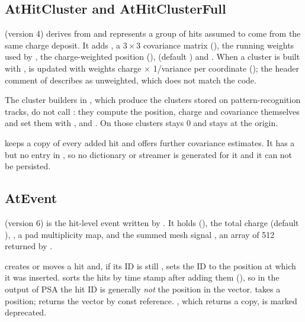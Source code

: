 \subsection{AtHitCluster and AtHitClusterFull}

 (version 4) derives from  and represents a group of hits assumed to come
from the same charge deposit. It adds , a $3\times3$ covariance matrix
 (), the running weights used by , the charge-weighted
position  (),  (default ) and
. When a cluster is built with ,  is
updated with weights charge $\times$ 1/variance per coordinate (); the
header comment of  describes  as unweighted, which does not match
the code.

The cluster builders in , which produce the clusters stored on
pattern-recognition tracks, do not call : they compute the position, charge and covariance
themselves and set them with ,  and . On those
clusters  stays 0 and  stays at the origin.

 keeps a copy of every added hit and offers further covariance estimates. It has
a  but no entry in , so no dictionary
or streamer is generated for it and it can not be persisted.

\subsection{AtEvent}

 (version 6) is the hit-level event written by . It holds
 (), the total charge 
(default ), , a pad multiplicity map, and the summed mesh signal , an
array of 512  returned by .

 creates or moves a hit and, if its ID is still , sets the ID to the position
at which it was inserted.  sorts the hits by time stamp after adding them
(), so in the output of PSA the hit ID is generally \emph{not} the position in
the vector.  takes a position;  returns the vector by const reference.
, which returns a copy, is marked deprecated.

